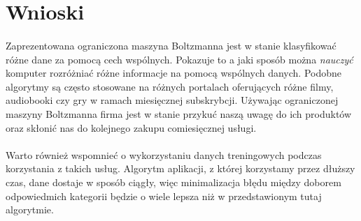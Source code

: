 \section{Wnioski}
    \paragraph{}
	Zaprezentowana ograniczona maszyna Boltzmanna jest w stanie klasyfikować różne dane za pomocą cech wspólnych.
	Pokazuje to a jaki sposób można \textit{nauczyć} komputer rozróżniać różne informacje na pomocą wspólnych danych.
	Podobne algorytmy są często stosowane na różnych portalach oferujących różne filmy, audiobooki czy gry w ramach miesięcznej subskrybcji.
	Używając ograniczonej maszyny Boltzmanna firma jest w stanie przykuć naszą uwagę do ich produktów oraz skłonić nas
	do kolejnego zakupu comiesięcznej usługi.
    \paragraph{}
	Warto również wspomnieć o wykorzystaniu danych treningowych podczas korzystania z takich usług. Algorytm aplikacji,
	z której korzystamy przez dłuższy czas, dane dostaje w sposób ciągły, więc minimalizacja błędu między doborem odpowiedmich kategorii
	będzie o wiele lepsza niż w przedstawionym tutaj algorytmie.

